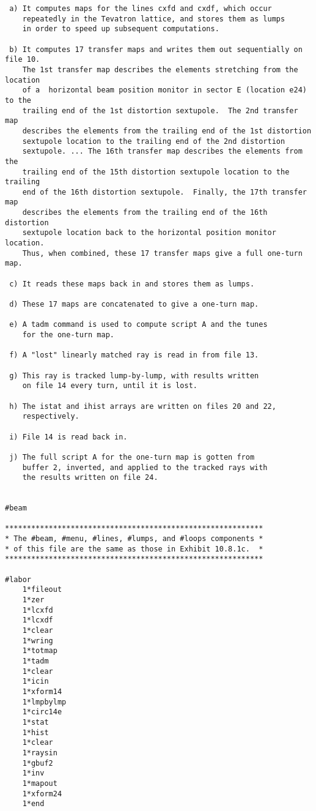\begin{footnotesize}
\begin{verbatim}
 a) It computes maps for the lines cxfd and cxdf, which occur
    repeatedly in the Tevatron lattice, and stores them as lumps
    in order to speed up subsequent computations.

 b) It computes 17 transfer maps and writes them out sequentially on file 10.
    The 1st transfer map describes the elements stretching from the location
    of a  horizontal beam position monitor in sector E (location e24) to the
    trailing end of the 1st distortion sextupole.  The 2nd transfer map
    describes the elements from the trailing end of the 1st distortion
    sextupole location to the trailing end of the 2nd distortion
    sextupole. ... The 16th transfer map describes the elements from the
    trailing end of the 15th distortion sextupole location to the trailing
    end of the 16th distortion sextupole.  Finally, the 17th transfer map
    describes the elements from the trailing end of the 16th distortion
    sextupole location back to the horizontal position monitor location.
    Thus, when combined, these 17 transfer maps give a full one-turn map.

 c) It reads these maps back in and stores them as lumps.

 d) These 17 maps are concatenated to give a one-turn map.

 e) A tadm command is used to compute script A and the tunes
    for the one-turn map.

 f) A "lost" linearly matched ray is read in from file 13.

 g) This ray is tracked lump-by-lump, with results written
    on file 14 every turn, until it is lost.

 h) The istat and ihist arrays are written on files 20 and 22,
    respectively.

 i) File 14 is read back in.

 j) The full script A for the one-turn map is gotten from
    buffer 2, inverted, and applied to the tracked rays with
    the results written on file 24.


#beam

***********************************************************
* The #beam, #menu, #lines, #lumps, and #loops components *
* of this file are the same as those in Exhibit 10.8.1c.  *
***********************************************************

#labor
    1*fileout
    1*zer
    1*lcxfd
    1*lcxdf
    1*clear
    1*wring
    1*totmap
    1*tadm
    1*clear
    1*icin
    1*xform14
    1*lmpbylmp
    1*circ14e
    1*stat
    1*hist
    1*clear
    1*raysin
    1*gbuf2
    1*inv
    1*mapout
    1*xform24
    1*end


\end{verbatim}
\end{footnotesize}
